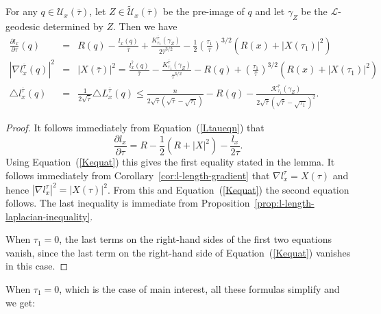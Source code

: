 \begin{lemma}\label{lem:reduced-length-differential-inequalities}
\label{linequal}

For any  $q\in{\mathcal U}_x(\bar\tau)$, let $Z\in
\widetilde{\mathcal U}_x(\bar\tau)$ be the pre-image of $q$ and let
$\gamma_Z$ be the ${\mathcal L}$-geodesic determined by $Z$. Then we
have
\begin{eqnarray*} \frac{\partial l_x}{\partial \tau}(q) & = &
R(q)-\frac{l_x(q)}{\bar\tau}+\frac{K_{\tau_1}^{\bar\tau}(\gamma_Z)}{2\bar\tau^{3/2}}-\frac{1}{2}\left(\frac{\tau_1}{\bar\tau}
\right)^{3/2}\left(R(x)+|X(\tau_1)|^2\right) \\
|\nabla l^{\bar\tau}_x(q)|^2 & = & |X(\bar\tau)|^2
=\frac{l^{\bar\tau}_x(q)}{\bar\tau}-\frac{K_{\tau_1}^{\bar\tau}
(\gamma_Z)}{\bar\tau^{3/2}}-R(q) +\left(\frac{\tau_1}{\bar\tau}
\right)^{3/2}\left(R(x)+|X(\tau_1)|^2\right) \\
\triangle l^{\bar\tau}_x(q) & = & \frac{1}{2\sqrt{\bar\tau}}\triangle
L^{\bar\tau}_x(q)\le \frac{n}{2\sqrt{\bar\tau}(\sqrt{\bar\tau}-\sqrt{\tau_1})}
-R(q)-\frac{{\mathcal
K}_{\tau_1}^{\bar\tau}(\gamma_Z)}{2\sqrt{\bar\tau}(\sqrt{\bar\tau}-\sqrt{\tau_1})^{2}}.
\end{eqnarray*}
\end{lemma}

\begin{proof}
\sketch
{}
 It follows immediately from Equation~(\ref{Ltaueqn}) that
$$\frac{\partial l_x}{\partial \tau}=R-\frac{1}{2}(R+|X|^2)-\frac{l_x}{2\tau}.$$
Using Equation~(\ref{Kequat}) this gives the first equality stated
in the lemma.
 It follows immediately from Corollary~\ref{cor:l-length-gradient} that
$\nabla l_x^\tau=X(\tau)$ and hence $|\nabla
l_x^\tau|^2=|X(\tau)|^2$. From this and Equation~(\ref{Kequat}) the
second equation follows. The last inequality is immediate from
Proposition~\ref{prop:l-length-laplacian-inequality}.

When $\tau_1=0$, the last terms on the right-hand sides of the first
two equations vanish, since the last term on the right-hand side of
Equation~(\ref{Kequat}) vanishes in this case.
\end{proof}

When $\tau_1=0$, which is the case of main interest, all these
formulas simplify and we get:

